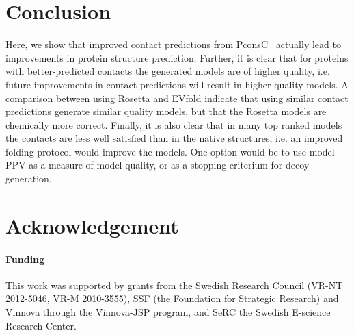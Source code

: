\documentclass{bioinfo}
\begin{document}
\section{Conclusion}


Here, we show that improved contact predictions from
PconsC~\cite{skwark_PconsC:_2013} actually lead to improvements in
protein structure prediction. Further, it is clear that for proteins
with better-predicted contacts the generated models are of higher
quality, i.e. future improvements in contact predictions will result
in higher quality models. A comparison between using Rosetta and
EVfold indicate that using similar contact predictions generate
similar quality models, but that the Rosetta models are chemically
more correct. Finally, it is also clear that in many top ranked models
the contacts are less well satisfied than in the native structures,
i.e. an improved folding protocol would improve the models. One
option would be to use model-PPV as a measure of model quality, or as
a stopping criterium for decoy generation.







\section*{Acknowledgement}

\paragraph{Funding\textcolon} %
This work was supported by grants from the Swedish
Research Council (VR-NT 2012-5046, VR-M 2010-3555), SSF (the Foundation for
Strategic Research) and Vinnova through the Vinnova-JSP program, and SeRC the
Swedish E-science Research Center.


%
%
%
%
%
%
%

\end{document}
